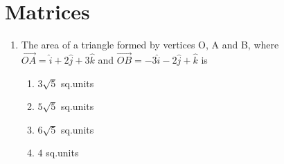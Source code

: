 \documentclass[journal,12pt,twocolumn]{IEEEtran}
\renewcommand\thesection{\arabic{section}}
\begin{document}
\section{Matrices}
\renewcommand{\theequation}{\theenumi}
\begin{enumerate}[label=\thesection.\arabic*.,ref=\thesection.\theenumi]
\item The area of a triangle formed by vertices O, A and B, where $\overrightarrow{OA}=\hat{i} + 2\hat{j} + 3 \hat{k} $ and $\overrightarrow{OB}=-3\hat{i} - 2\hat{j} +  \hat{k} $ is \\
 \begin{enumerate}
     \item $ 3\sqrt{5} $ sq.units\\
    \item$ 5\sqrt{5} $ sq.units\\
    \item$ 6\sqrt{5} $ sq.units\\
    \item$ 4 $ sq.units
\end{enumerate}
\end{enumerate}
\end{document}
